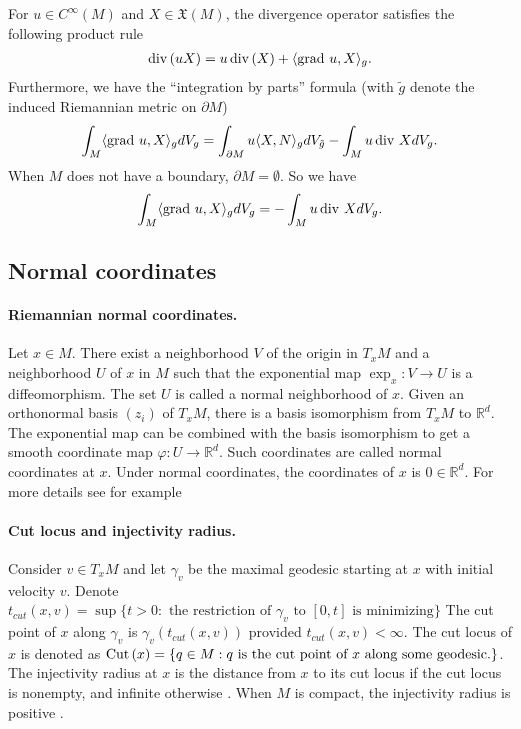 For $u \in C^{\infty}(M)$ and $X \in \mathfrak{X}(M)$,
the divergence operator satisfies the following product rule 
\begin{align*}
    \operatorname{div\,} (uX) = u \operatorname{div\,}(X) + \langle \operatorname{grad\,} u, X\rangle_{g}.
\end{align*}
Furthermore, we have the ``integration by parts'' formula 
(with $\tilde{g}$ denote the induced Riemannian metric on $\partial M$)
\begin{align*}
    \int_{M} \langle \operatorname{grad\,} u, X \rangle_{g} dV_{g} 
    = \int_{\partial M} u \langle X, N \rangle_{g} dV_{\tilde{g}}
    - \int_{M} u \operatorname{div\,} X dV_{g}.
\end{align*}
When $M$ does not have a boundary, $\partial M = \emptyset$. So we have 
\begin{align*}
    \int_{M} \langle \operatorname{grad\,} u, X \rangle_{g} dV_{g} = - \int_{M} u \operatorname{div\,} X dV_{g}.
\end{align*}



\subsection{Normal coordinates}

\paragraph{Riemannian normal coordinates.}
Let $x \in M$. There exist a neighborhood $V$ of the origin in $T_{x}M$
and a neighborhood $U$ of $x$ in $M$ such that the exponential map $\exp_{x}: V \to U$ 
is a diffeomorphism. The set $U$ is called a normal neighborhood of $x$.
Given an orthonormal basis $(z_{i})$ of $T_{x}M$, there is a basis isomorphism from $T_{x}M$ to $\mathbb{R}^{d}$.
The exponential map can be combined with the basis isomorphism to get a smooth coordinate map $\varphi: U \to \mathbb{R}^{d}$. 
Such coordinates are called normal coordinates at $x$. 
Under normal coordinates, the coordinates of $x$ is $0 \in \mathbb{R}^{d}$. For more details see for example \citet[Chapter 5]{lee2018introduction}

\paragraph{Cut locus and injectivity radius.}
Consider $v \in T_{x}M$ and let $\gamma_{v}$ be the maximal geodesic starting at $x$ with initial velocity $v$. 
Denote $t_{cut}(x, v) = \sup \{t > 0: \text{ the restriction of } \gamma_{v} \text{ to } [0, t] \text{ is minimizing}\}$
The cut point of $x$ along $\gamma_{v}$ is $\gamma_{v}(t_{cut}(x, v))$ provided $t_{cut}(x, v) < \infty$.
The cut locus of $x$ is denoted as 
$\operatorname{Cut\,}(x) = \{q \in M: q \text{ is the cut point of } x \text{ along some geodesic.}\}$.
The injectivity radius at $x$ is the distance from $x$ to its cut locus if the
cut locus is nonempty, and infinite otherwise \cite[Proposition 10.36]{lee2018introduction}.
When $M$ is compact, the injectivity radius is positive \cite[Lemma 6.16]{lee2018introduction}.

